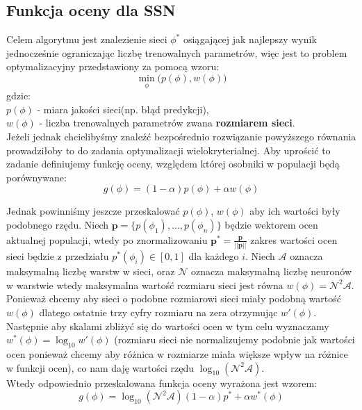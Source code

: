 \documentclass{article}
\renewcommand{\vec}[1]{\mathbf{#1}}
\begin{document}
\subsection{Funkcja oceny dla SSN}
Celem algorytmu jest znalezienie sieci $\phi^{*}$ osiągającej jak najlepszy wynik jednocześnie
ograniczając liczbę trenowalnych parametrów, więc jest to problem optymalizacyjny 
przedstawiony za pomocą wzoru:
\begin{equation}
	\underset{\phi}{\min}\big(p(\phi), w(\phi)\big)
\end{equation}
gdzie:\\
$p(\phi)$ - miara jakości sieci(np. błąd predykcji),\\
$w(\phi)$ - liczba trenowalnych parametrów zwana \textbf{rozmiarem sieci}.\\
Jeżeli jednak chcielibyśmy znaleźć bezpośrednio rozwiązanie powyższego równania
prowadziłoby to do zadania optymalizacji wielokryterialnej. Aby uprościć to zadanie
definiujemy funkcję oceny, względem której osobniki w populacji będą porównywane:
\begin{equation}
	g(\phi) = (1 - \alpha)p(\phi) + \alpha w(\phi)
\end{equation}

Jednak powinniśmy jeszcze przeskalować $p(\phi)$, $w(\phi)$ aby ich wartości były podobnego 
rzędu. Niech $\vec{p} = \{p(\phi_1), ..., p(\phi_n)\}$ będzie wektorem ocen aktualnej populacji,
wtedy po znormalizowaniu $\vec{p}^{*} = \frac{\vec{p}}{||\vec{p}||}$ zakres wartości ocen sieci
będzie z przedziału $p^{*}(\phi_i) \in [0, 1]$ dla każdego $i$. Niech $\mathcal{A}$ oznacza
maksymalną liczbę warstw w sieci, oraz $\mathcal{N}$ oznacza maksymalną liczbę neuronów w 
warstwie wtedy maksymalna wartość rozmiaru sieci jest równa $w(\phi) = \mathcal{N}^2\mathcal{A}$.
Ponieważ chcemy aby sieci o podobne rozmiarowi sieci miały podobną wartość $w(\phi)$ dlatego
ostatnie trzy cyfry rozmiaru na zera otrzymując $w'(\phi)$. Następnie aby skalami zbliżyć się do 
wartości ocen w tym celu wyznaczamy $w^{*}(\phi) = \log_{10}w'(\phi)$ (rozmiaru sieci
nie normalizujemy podobnie jak wartości ocen ponieważ chcemy aby różnica w rozmiarze
miała większe wpływ na różnice w funkcji ocen), co nam daję wartości
rzędu $\log_{10}(\mathcal{N}^2\mathcal{A})$.\\
Wtedy odpowiednio przeskalowana funkcja oceny wyrażona jest wzorem:
\begin{equation}
	g(\phi) = \log_{10}(\mathcal{N}^2\mathcal{A})(1 - \alpha)p^{*} + \alpha w^{*}(\phi)
\end{equation}
\end{document}
